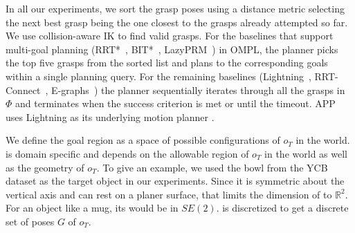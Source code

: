\documentclass[a4paper]{report}
\begin{document}
In all our experiments, we sort the grasp poses using a distance metric selecting the next best grasp being the one closest to the grasps already attempted so far. We use collision-aware IK to find valid grasps. For the baselines that support multi-goal planning (RRT*~\cite{karaman2011sampling}, BIT*~\cite{gammell2020batch}, LazyPRM~\cite{kavraki2000path}) in OMPL, the planner picks the top five grasps from the sorted list and plans to the corresponding goals within a single planning query. For the remaining baselines (Lightning~\cite{berenson2012robot}, RRT-Connect~\cite{kuffner2000rrt}, E-graphs~\cite{Phillips-RSS-12}) the planner sequentially iterates through all the grasps in $\Phi$ and terminates when the success criterion is met or until the timeout. APP uses Lightning as its underlying motion planner \calP.

We define the goal region \calG as a space of possible configurations of $o_T$ in the world. \calG is domain specific and depends on the allowable region of $o_T$ in the world as well as the geometry of $o_T$. To give an example, we used the bowl from the YCB dataset as the target object in our experiments. Since it is symmetric about the vertical axis and can rest on a planer surface, that limits the dimension of \calG to $\mathbb{R}^2$. For an object like a mug, its \calG would be in $SE(2)$. \calG is discretized to get a discrete set of poses $G$ of $o_T$.



\end{document}

